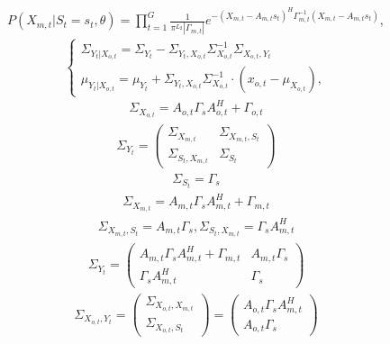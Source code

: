 \documentclass[11pt]{article}
\begin{document}
\begin{gather}
P(X_{m,t}|S_t=s_t,\theta) = \prod_{t=1}^G \frac{1}{\pi^{L_2} |\Gamma_{m,t}|}e^{-(X_{m,t}-A_{m,t} s_t)^H \Gamma_{m,t}^{-1}(X_{m,t}-A_{m,t} s_t)},
\end{gather}
\begin{equation}
\left\{ \begin{gathered} 
\Sigma_{Y_t|X_{o,t}} = \Sigma_{Y_t}-\Sigma_{Y_t,X_{o,t}}\Sigma_{X_{o,t}}^{-1}\Sigma_{X_{o,t},Y_t} \\
\mu_{Y_t|X_{o,t}} = \mu_{Y_t} + \Sigma_{Y_t,X_{o,t}}\Sigma_{X_{o,t}}^{-1}\cdot(x_{o,t}-\mu_{X_{o,t}}),
\end{gathered} \right.
\end{equation}
\begin{gather}
\Sigma_{X_{o,t}}=A_{o,t}\Gamma_sA_{o,t}^H+\Gamma_{o,t}
\end{gather}
\begin{gather}
\Sigma_{Y_t} = \begin{pmatrix}
\Sigma_{X_{m,t}}&\Sigma_{X_{m,t}, S_t}\\
\Sigma_{S_t, X_{m,t}}&\Sigma_{S_t}
\end{pmatrix}
\end{gather}
\begin{gather}
\Sigma_{S_t} = \Gamma_s
\end{gather}
\begin{gather}
\Sigma_{X_{m,t}} = A_{m,t} \Gamma_s A_{m,t}^H + \Gamma_{m,t}
\end{gather}
\begin{gather}
\Sigma_{X_{m,t},S_t} = A_{m,t} \Gamma_s, \Sigma_{S_t, X_{m,t}} = \Gamma_s A_{m,t}^H 
\end{gather}
\begin{gather}
\Sigma_{Y_t} = \begin{pmatrix}
A_{m,t} \Gamma_s A_{m,t}^H + \Gamma_{m,t}&A_{m,t} \Gamma_s\\
\Gamma_s A_{m,t}^H&\Gamma_s
\end{pmatrix}
\end{gather}
\begin{gather}
\Sigma_{X_{o,t},Y_t}
= \begin{pmatrix}
\Sigma_{X_{o,t},X_{m,t}}\\
\Sigma_{X_{o,t},S_t}
\end{pmatrix}= 
\begin{pmatrix}
A_{o,t}\Gamma_s A_{m,t}^H\\
A_{o,t}\Gamma_s
\end{pmatrix}
\end{gather}
\end{document}
